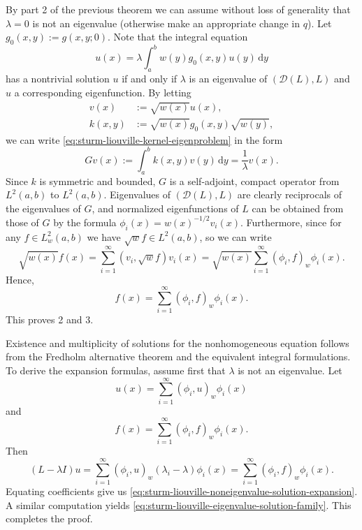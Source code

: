 \begin{Proof}
By part 2 of the previous theorem we can assume without loss of generality that $\lambda=0$ is not an eigenvalue (otherwise make an appropriate change in $q$). Let $g_0(x,y):=g(x,y;0)$. Note that the integral equation
\begin{equation}\label{eq:sturm-liouville-kernel-eigenproblem}
u(x)=\lambda\int_a^bw(y)g_0(x,y)u(y)\,\mathrm{d}y
\end{equation}
has a nontrivial solution $u$ if and only if $\lambda$ is an eigenvalue of $(\mathcal{D}(L),L)$ and $u$ a corresponding eigenfunction. By letting\[\begin{aligned}
v(x)&:=\sqrt{w(x)}u(x),\\
k(x,y)&:=\sqrt{w(x)}g_0(x,y)\sqrt{w(y)},
\end{aligned}\]we can write \eqref{eq:sturm-liouville-kernel-eigenproblem} in the form
\begin{equation}\label{eq:sturm-liouville-unweighted-compact-eigenproblem}
Gv(x):=\int_a^bk(x,y)v(y)\,\mathrm{d}y=\dfrac{1}{\lambda}v(x).
\end{equation}
Since $k$ is symmetric and bounded, $G$ is a self-adjoint, compact operator from $L^2(a,b)$ to $L^2(a,b)$. Eigenvalues of $(\mathcal{D}(L),L)$ are clearly reciprocals of the eigenvalues of $G$, and normalized eigenfunctions of $L$ can be obtained from those of $G$ by the formula $\phi_i(x)=w(x)^{-1/2}v_i(x)$. Furthermore, since for any $f\in L_w^2(a,b)$ we have $\sqrt{w}f\in L^2(a,b)$, so we can write
\begin{equation}\label{eq:sturm-liouville-weighted-data-basis-expansion}
\sqrt{w(x)}f(x)=\sum_{i=1}^\infty(v_i,\sqrt{w}f)v_i(x)=\sqrt{w(x)}\sum_{i=1}^\infty(\phi_i,f)_w\phi_i(x).
\end{equation}
Hence,
\begin{equation}\label{eq:sturm-liouville-data-eigenfunction-expansion}
f(x)=\sum_{i=1}^\infty(\phi_i,f)_w\phi_i(x).
\end{equation}
This proves 2 and 3.

Existence and multiplicity of solutions for the nonhomogeneous equation follows from the Fredholm alternative theorem and the equivalent integral formulations. To derive the expansion formulas, assume first that $\lambda$ is not an eigenvalue. Let
\begin{equation}\label{eq:sturm-liouville-solution-basis-expansion}
u(x)=\sum_{i=1}^\infty(\phi_i,u)_w\phi_i(x)
\end{equation}
and
\begin{equation}\label{eq:sturm-liouville-forcing-basis-expansion}
f(x)=\sum_{i=1}^\infty(\phi_i,f)_w\phi_i(x).
\end{equation}
Then
\begin{equation}\label{eq:sturm-liouville-equating-spectral-coefficients}
(L-\lambda I)u=\sum_{i=1}^\infty(\phi_i,u)_w(\lambda_i-\lambda)\phi_i(x)=\sum_{i=1}^\infty(\phi_i,f)_w\phi_i(x).
\end{equation}
Equating coefficients give us \eqref{eq:sturm-liouville-noneigenvalue-solution-expansion}. A similar computation yields \eqref{eq:sturm-liouville-eigenvalue-solution-family}. This completes the proof.
\end{Proof}
